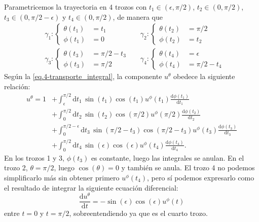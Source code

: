 \begin{example}
    Parametricemos la trayectoria en 4 trozos con \(t_1\in(\epsilon,\pi/2)\), \(t_2\in(0,\pi/2)\), \(t_3\in(0, \pi/2-\epsilon)\) y \(t_4\in(0,\pi/2)\), de manera que
    \begin{align*}
        &\gamma_1:\left\{\begin{aligned}
            \theta(t_1) &= t_1\\
            \phi(t_1) &= 0
        \end{aligned}\right.
        &&\gamma_2:\left\{\begin{aligned}
            \theta(t_2) &= \pi/2\\
            \phi(t_2) &= t_2
        \end{aligned}\right.\\
        &\gamma_3:\left\{\begin{aligned}
            \theta(t_3) &= \pi/2-t_3\\
            \phi(t_3) &= \pi/2
        \end{aligned}\right.
        &&\gamma_4:\left\{\begin{aligned}
            \theta(t_4) &= \epsilon\\
            \phi(t_4) &= \pi/2-t_4
        \end{aligned}\right.
    \end{align*}  
    Según la \cref{eq.4-transporte_integral}, la componente \(u^\theta\) obedece la siguiente relación:
    \begin{align*}
        u^\theta = 1& + \int_\epsilon^{\pi/2} \mathrm{d}t_1\, \sin(t_1)\cos(t_1) u^\phi(t_1) \frac{\mathrm{d}\phi(t_1)}{\mathrm{d}t_1} \\
        &+ \int_0^{\pi/2} \mathrm{d}t_2\, \sin(t_2)\cos(\pi/2) u^\phi(\pi/2) \frac{\mathrm{d}\phi(t_2)}{\mathrm{d}t_2}\\
        &+ \int_0^{\pi/2-\epsilon} \mathrm{d}t_3\, \sin(\pi/2-t_3)\cos(\pi/2-t_3) u^\phi(t_3) \frac{\mathrm{d}\phi(t_3)}{\mathrm{d}t_3}\\
        &+ \int_0^{\pi/2} \mathrm{d}t_4\, \sin(\epsilon)\cos(\epsilon) u^\phi(t_4) \frac{\mathrm{d}\phi(t_4)}{\mathrm{d}t_4}.
    \end{align*}
    En los trozos 1 y 3, \(\phi(t_3)\) es constante, luego las integrales se anulan. En el trozo 2, \(\theta = \pi/2\), luego \(\cos(\theta)=0\) y también se anula. El trozo 4 no podemos simplificarlo más sin obtener primero \(u^\phi(t_4)\), pero sí podemos expresarlo como el resultado de integrar la siguiente ecuación diferencial:
    \begin{equation}
        \label{eq.4-examplea}
        \frac{\mathrm{d}u^\theta}{\mathrm{d}t} = - \sin(\epsilon)\cos(\epsilon) u^\phi(t)
    \end{equation}
    entre \(t=0\) y \(t=\pi/2\), sobreentendiendo ya que es el cuarto trozo.
    

\end{example}
